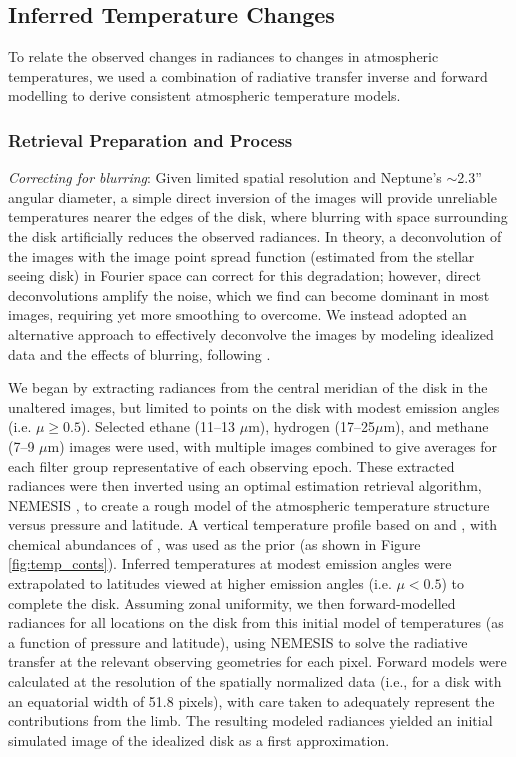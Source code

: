 \documentclass[twocolumn,10pt]{aastex631}
\begin{document}
\subsection{Inferred Temperature Changes}
To relate the observed changes in radiances to changes in atmospheric temperatures, we used a combination of radiative transfer inverse and forward modelling to derive consistent atmospheric temperature models. 

\subsubsection{Retrieval Preparation and Process} \textit{Correcting for blurring}:  Given limited spatial resolution and Neptune's $\sim$2.3'' angular diameter, a simple direct inversion of the images will provide unreliable temperatures nearer the edges of the disk, where blurring with space surrounding the disk artificially reduces the observed radiances. In theory, a deconvolution of the images with the image point spread function (estimated from the stellar seeing disk) in Fourier space can correct for this degradation; however, direct deconvolutions amplify the noise, which we find can become dominant in most images, requiring yet more smoothing to overcome.  We instead adopted an alternative approach to effectively deconvolve the images by modeling idealized data and the effects of blurring, following \citet{roman2020uranus}. 

We began by extracting radiances from the central meridian of the disk in the unaltered images, but limited to points on the disk with modest emission angles (i.e. $\mu\geq0.5$). Selected ethane (11--13 $\mu$m), hydrogen (17--25$\mu$m), and methane (7--9 $\mu$m) images were used, with multiple images combined to give averages for each filter group representative of each observing epoch. These extracted radiances were then inverted using an optimal estimation retrieval algorithm, NEMESIS \citep{irwin2008nemesis}, to create a rough model of the atmospheric temperature structure versus pressure and latitude. A vertical temperature profile based on \citet{moses2005photochemistry} and  \citet{greathouse2011spatially}, with chemical abundances of \citet{moses2018seasonal}, was used as the prior (as shown in Figure \ref{fig:temp_conts}). Inferred temperatures at modest emission angles were extrapolated to latitudes viewed at higher emission angles (i.e. $\mu<0.5$) to complete the disk. Assuming zonal uniformity, we then forward-modelled radiances for all locations on the disk from this initial model of temperatures (as a function of pressure and latitude), using NEMESIS to solve the radiative transfer at the relevant observing geometries for each pixel.  Forward models were calculated at the resolution of the spatially normalized data (i.e., for a disk with an equatorial width of 51.8 pixels), with care taken to adequately represent the contributions from the limb. The resulting modeled radiances yielded an initial simulated image of the idealized disk as a first approximation.
\end{document}
